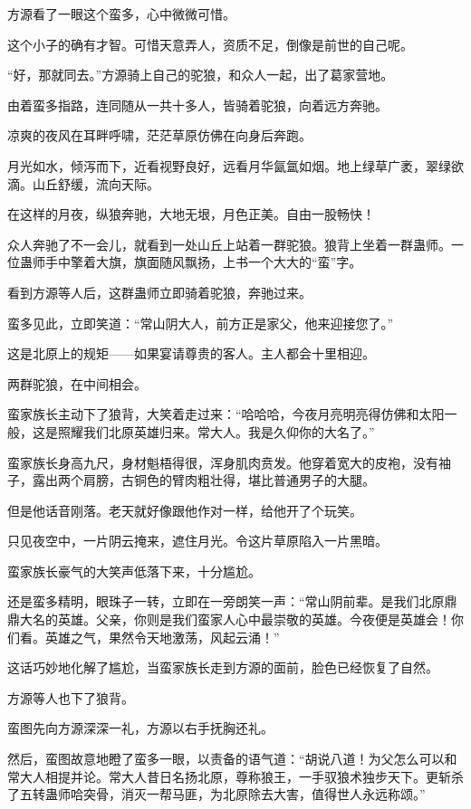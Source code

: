 \begin{this_body}
方源看了一眼这个蛮多，心中微微可惜。

这个小子的确有才智。可惜天意弄人，资质不足，倒像是前世的自己呢。

“好，那就同去。”方源骑上自己的驼狼，和众人一起，出了葛家营地。

由着蛮多指路，连同随从一共十多人，皆骑着驼狼，向着远方奔驰。

凉爽的夜风在耳畔呼啸，茫茫草原仿佛在向身后奔跑。

月光如水，倾泻而下，近看视野良好，远看月华氤氲如烟。地上绿草广袤，翠绿欲滴。山丘舒缓，流向天际。

在这样的月夜，纵狼奔驰，大地无垠，月色正美。自由一股畅快！

众人奔驰了不一会儿，就看到一处山丘上站着一群驼狼。狼背上坐着一群蛊师。一位蛊师手中擎着大旗，旗面随风飘扬，上书一个大大的“蛮”字。

看到方源等人后，这群蛊师立即骑着驼狼，奔驰过来。

蛮多见此，立即笑道：“常山阴大人，前方正是家父，他来迎接您了。”

这是北原上的规矩——如果宴请尊贵的客人。主人都会十里相迎。

两群驼狼，在中间相会。

蛮家族长主动下了狼背，大笑着走过来：“哈哈哈，今夜月亮明亮得仿佛和太阳一般，这是照耀我们北原英雄归来。常大人。我是久仰你的大名了。”

蛮家族长身高九尺，身材魁梧得很，浑身肌肉贲发。他穿着宽大的皮袍，没有袖子，露出两个肩膀，古铜色的臂肉粗壮得，堪比普通男子的大腿。

但是他话音刚落。老天就好像跟他作对一样，给他开了个玩笑。

只见夜空中，一片阴云掩来，遮住月光。令这片草原陷入一片黑暗。

蛮家族长豪气的大笑声低落下来，十分尴尬。

还是蛮多精明，眼珠子一转，立即在一旁朗笑一声：“常山阴前辈。是我们北原鼎鼎大名的英雄。父亲，你则是我们蛮家人心中最崇敬的英雄。今夜便是英雄会！你们看。英雄之气，果然令天地激荡，风起云涌！”

这话巧妙地化解了尴尬，当蛮家族长走到方源的面前，脸色已经恢复了自然。

方源等人也下了狼背。

蛮图先向方源深深一礼，方源以右手抚胸还礼。

然后，蛮图故意地瞪了蛮多一眼，以责备的语气道：“胡说八道！为父怎么可以和常大人相提并论。常大人昔日名扬北原，尊称狼王，一手驭狼术独步天下。更斩杀了五转蛊师哈突骨，消灭一帮马匪，为北原除去大害，值得世人永远称颂。”


\end{this_body}
